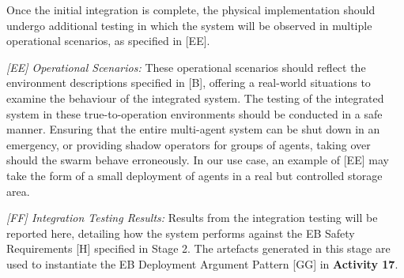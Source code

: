 \documentclass[runningheads]{llncs}
\begin{document}
Once the initial integration is complete, the physical implementation should undergo additional testing in which the system will be observed in multiple operational scenarios, as specified in [EE].

\emph{[EE] Operational Scenarios:} These operational scenarios should reflect the environment descriptions specified in [B], offering a real-world situations to examine the behaviour of the integrated system. The testing of the integrated system in these true-to-operation environments should be conducted in a safe manner. Ensuring that the entire multi-agent system can be shut down in an emergency, or providing shadow operators for groups of agents, taking over should the swarm behave erroneously. In our use case, an example of [EE] may take the form of a small deployment of agents in a real but controlled storage area.

\emph{[FF] Integration Testing Results:} Results from the integration testing will be reported here, detailing how the system performs against the EB Safety Requirements [H] specified in Stage 2. 
The artefacts generated in this stage are used to instantiate the EB Deployment Argument Pattern [GG] in \textbf{Activity 17}.
\end{document}
